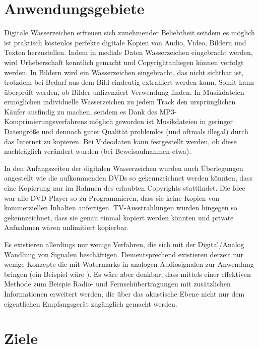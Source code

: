 \section{Anwendungsgebiete}

Digitale Wasserzeichen erfreuen sich zunehmender Beliebtheit seitdem es möglich ist praktisch kostenlos perfekte digitale Kopien von Audio, Video, Bildern und Texten herzustellen\cite{mintzer1997effective}. Indem in mediale Daten Wasserzeichen eingebracht werden, wird Urheberschaft kenntlich gemacht und Copyrightanliegen können verfolgt werden. In Bildern wird ein Wasserzeichen eingebracht, das nicht sichtbar ist, trotzdem bei Bedarf aus dem Bild eindeutig extrahiert werden kann. Somit kann überprüft werden, ob Bilder unlizenziert Verwendung finden. In Musikdateien ermöglichen individuelle Wasserzeichen zu jedem Track den ursprünglichen Käufer ausfindig zu machen, seitdem es Dank des MP3-Komprimierungsverfahrens möglich geworden ist Musikdateien in geringer Datengröße und dennoch guter Qualität problemlos (und oftmals illegal) durch das Internet zu kopieren. Bei Videodaten kann festgestellt werden, ob diese nachträglich verändert wurden (bei Beweisaufnahmen etwa). 

In den Anfangszeiten der digitalen Wasserzeichen wurden auch Überlegungen angestellt wie die aufkommenden DVDs so gekennzeichnet werden könnten, dass eine Kopierung nur im Rahmen des erlaubten Copyrights stattfindet\cite{petitcolas1999information}. Die Idee war alle DVD Player so zu Programmieren, dass sie keine Kopien von kommerziellen Inhalten anfertigen. TV-Ausstrahlungen würden hingegen so gekennzeichnet, dass sie genau einmal kopiert werden könnten und private Aufnahmen wären unlimitiert kopierbar. 

Es existieren allerdings nur wenige Verfahren, die sich mit der Digital/Analog Wandlung von Signalen beschäftigen. Dementsprechend existieren derzeit nur wenige Konzepte die mit Watermarks in analogen Audiosignalen zur Anwendung bringen (ein Beispiel wäre \cite{chang2012location}). Es wäre aber denkbar, dass mittels einer effektiven Methode zum Beispie Radio- und Fernsehübertragungen mit zusätzlichen Informationen erweitert werden, die über das akustische Ebene nicht nur dem eigentlichen Empfangsgerät zugänglich gemacht werden.

\section{Ziele}

